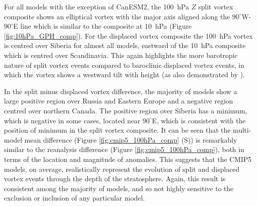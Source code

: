 For all models with the exception of CanESM2, the 100~hPa $Z$ split vortex
composite shows an elliptical vortex with the major axis aligned along the
$90^{\circ}$W-$90^{\circ}$E line which is similar to the composite at 10~hPa
(Figure \ref{fig:10hPa_GPH_comp}). For the displaced vortex composite the
100~hPa vortex is centred over Siberia for almost all models, eastward of the
10~hPa composite which is centred over Scandinavia. This again highlights the
more barotropic nature of split vortex events compared to baroclinic displaced
vortex events, in which the vortex shows a westward tilt with height (as also
demonstrated by \citet{Matthewman2009}).

In the split minus displaced vortex difference, the majority of models show a
large positive region over Russia and Eastern Europe and a negative region
centred over northern Canada. The positive region over Siberia has a minimum,
which is negative in some cases, located near $90^{\circ}$E, which is consistent
with the position of minimum in the split vortex composite. It can be seen that
the multi-model mean difference (Figure \ref{fig:cmip5_100hPa_comp} (S)) is
remarkably similar to the reanalysis difference (Figure
\ref{fig:cmip5_100hPa_comp}), both in terms of the location and magnitude of
anomalies. This suggests that the CMIP5 models, on average, realistically
represent the evolution of split and displaced vortex events through the depth
of the stratosphere. Again, this result is consistent among the majority of
models, and so not highly sensitive to the exclusion or inclusion of any
particular model. 


